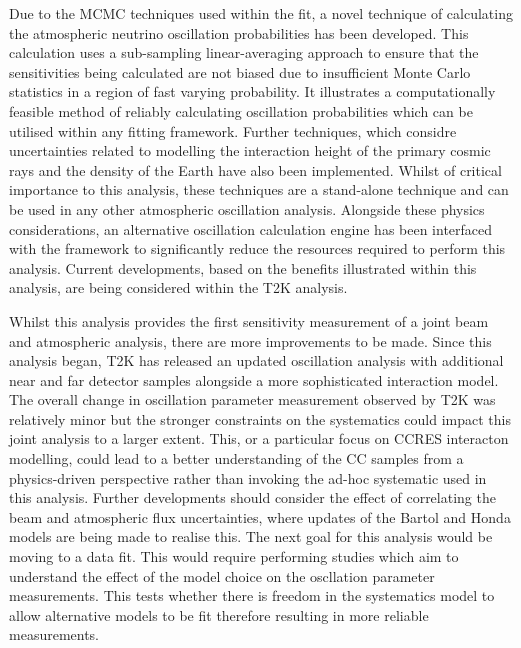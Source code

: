 Due to the MCMC techniques used within the fit, a novel technique of calculating the atmospheric neutrino oscillation probabilities has been developed. This calculation uses a sub-sampling linear-averaging approach to ensure that the sensitivities being calculated are not biased due to insufficient Monte Carlo statistics in a region of fast varying probability. It illustrates a computationally feasible method of reliably calculating oscillation probabilities which can be utilised within any fitting framework. Further techniques, which considre uncertainties related to modelling the interaction height of the primary cosmic rays and the density of the Earth have also been implemented. Whilst of critical importance to this analysis, these techniques are a stand-alone technique and can be used in any other atmospheric oscillation analysis. Alongside these physics considerations, an alternative oscillation calculation engine has been interfaced with the framework to significantly reduce the resources required to perform this analysis. Current developments, based on the benefits illustrated within this analysis, are being considered within the T2K analysis.


Whilst this analysis provides the first sensitivity measurement of a joint beam and atmospheric analysis, there are more improvements to be made. Since this analysis began, T2K has released an updated oscillation analysis with additional near and far detector samples alongside a more sophisticated interaction model. The overall change in oscillation parameter measurement observed by T2K was relatively minor  but the stronger constraints on the systematics could impact this joint analysis to a larger extent. This, or a particular focus on CCRES interacton modelling, could lead to a better understanding of the CC\quickmath{1\pi} samples from a physics-driven perspective rather than invoking the ad-hoc systematic used in this analysis. Further developments should consider the effect of correlating the beam and atmospheric flux uncertainties, where updates of the Bartol and Honda models are being made to realise this. The next goal for this analysis would be moving to a data fit. This would require performing studies which aim to understand the effect of the model choice on the oscllation parameter measurements. This tests whether there is freedom in the systematics model to allow alternative models to be fit therefore resulting in more reliable measurements. 

